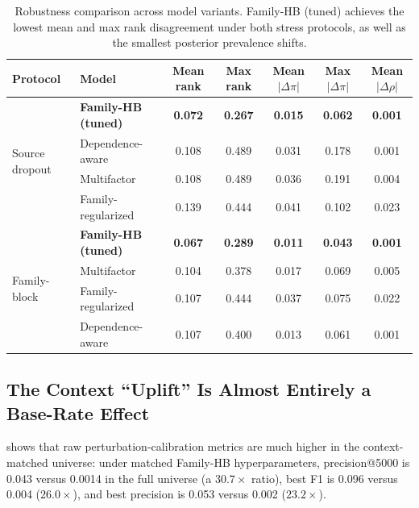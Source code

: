 \documentclass[11pt,a4paper]{article}
\begin{document}
\begin{table}[t]
  \centering
  \caption{Robustness comparison across model variants.
  Family-HB (tuned) achieves the lowest mean and max rank disagreement under both stress protocols, as well as the smallest posterior prevalence shifts.}
  \label{tab:robustness}
  \small
  \begin{tabular}{@{}llccccc@{}}
    \toprule
    Protocol & Model & Mean rank & Max rank & Mean $|\Delta\pi|$ & Max $|\Delta\pi|$ & Mean $|\Delta\rho|$ \\
    \midrule
    \multirow{4}{*}{Source dropout}
      & \textbf{Family-HB (tuned)} & \textbf{0.072} & \textbf{0.267} & \textbf{0.015} & \textbf{0.062} & \textbf{0.001} \\
      & Dependence-aware           & 0.108 & 0.489 & 0.031 & 0.178 & 0.001 \\
      & Multifactor                & 0.108 & 0.489 & 0.036 & 0.191 & 0.004 \\
      & Family-regularized         & 0.139 & 0.444 & 0.041 & 0.102 & 0.023 \\
    \midrule
    \multirow{4}{*}{Family-block}
      & \textbf{Family-HB (tuned)} & \textbf{0.067} & \textbf{0.289} & \textbf{0.011} & \textbf{0.043} & \textbf{0.001} \\
      & Multifactor                & 0.104 & 0.378 & 0.017 & 0.069 & 0.005 \\
      & Family-regularized         & 0.107 & 0.444 & 0.037 & 0.075 & 0.022 \\
      & Dependence-aware           & 0.107 & 0.400 & 0.013 & 0.061 & 0.001 \\
    \bottomrule
  \end{tabular}
\end{table}

\subsection{The Context ``Uplift'' Is Almost Entirely a Base-Rate Effect}\label{sec:res-calibration}

 shows that raw perturbation-calibration metrics are much higher in the context-matched universe: under matched Family-HB hyperparameters, precision@5000 is 0.043 versus 0.0014 in the full universe (a $30.7\times$ ratio), best F1 is 0.096 versus 0.004 ($26.0\times$), and best precision is 0.053 versus 0.002 ($23.2\times$).
\end{document}
